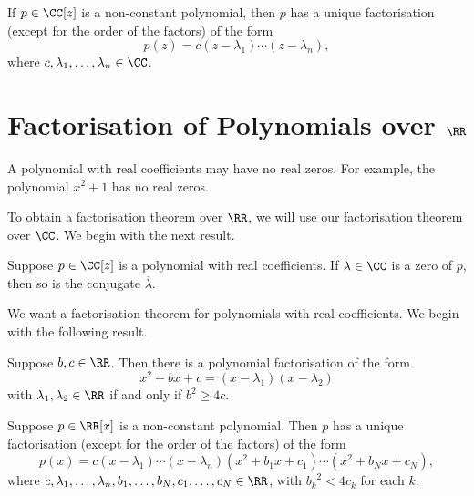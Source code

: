 \begin{theorem}
If $p\in\CC[z]$ is a non-constant polynomial, then $p$ has a unique factorisation (except for the order of the factors) of the form
\[p(z)=c(z-\lambda_1)\cdots(z-\lambda_n),\]
where $c,\lambda_1,\dots,\lambda_n\in\CC$.
\end{theorem}

\section{Factorisation of Polynomials over $\RR$}
A polynomial with real coefficients may have no real zeros. For example, the polynomial $x^2+1$ has no real zeros.

To obtain a factorisation theorem over $\RR$, we will use our factorisation theorem over $\CC$. We begin with the next result.

\begin{proposition}
Suppose $p\in\CC[z]$ is a polynomial with real coefficients. If $\lambda\in\CC$ is a zero of $p$, then so is the conjugate $\overline{\lambda}$.
\end{proposition}

We want a factorisation theorem for polynomials with real coefficients. We begin with the following result.

\begin{lemma}
Suppose $b,c\in\RR$. Then there is a polynomial factorisation of the form
\[x^2+bx+c=(x-\lambda_1)(x-\lambda_2)\]
with $\lambda_1,\lambda_2\in\RR$ if and only if $b^2\ge 4c$.
\end{lemma}

\begin{theorem}
Suppose $p\in\RR[x]$ is a non-constant polynomial. Then $p$ has a unique factorisation (except for the order of the factors) of the form
\[p(x)=c(x-\lambda_1)\cdots(x-\lambda_n)(x^2+b_1x+c_1)\cdots(x^2+b_Nx+c_N),\]
where $c,\lambda_1,\dots,\lambda_n,b_1,\dots,b_N,c_1,\dots,c_N\in\RR$, with ${b_k}^2<4c_k$ for each $k$.
\end{theorem}

